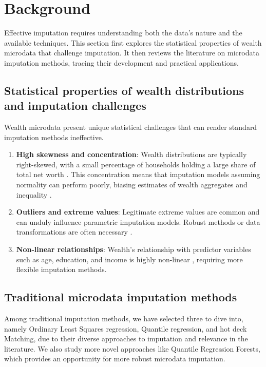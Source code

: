 \section{Background}

Effective imputation requires understanding both the data's nature and the available techniques. This section first explores the statistical properties of wealth microdata that challenge imputation. It then reviews the literature on microdata imputation methods, tracing their development and practical applications.

\subsection{Statistical properties of wealth distributions and imputation challenges}

Wealth microdata present unique statistical challenges that can render standard imputation methods ineffective.

\begin{enumerate}
    \item \textbf{High skewness and concentration}: Wealth distributions are typically right-skewed, with a small percentage of households holding a large share of total net worth \citep{chen2020imputation}. This concentration means that imputation models assuming normality can perform poorly, biasing estimates of wealth aggregates and inequality \citep{lun2019multiple}.
    \item \textbf{Outliers and extreme values}: Legitimate extreme values are common and can unduly influence parametric imputation models. Robust methods or data transformations are often necessary \citep{chen2020imputation}. 
    \item \textbf{Non-linear relationships}: Wealth's relationship with predictor variables such as age, education, and income is highly non-linear \citep{zillow2024quantile}, requiring more flexible imputation methods.
\end{enumerate}

\subsection{Traditional microdata imputation methods}

Among traditional imputation methods, we have selected three to dive into, namely Ordinary Least Squares regression, Quantile regression, and hot deck Matching, due to their diverse approaches to imputation and relevance in the literature. We also study more novel approaches like Quantile Regression Forests, which provides an opportunity for more robust microdata imputation.

